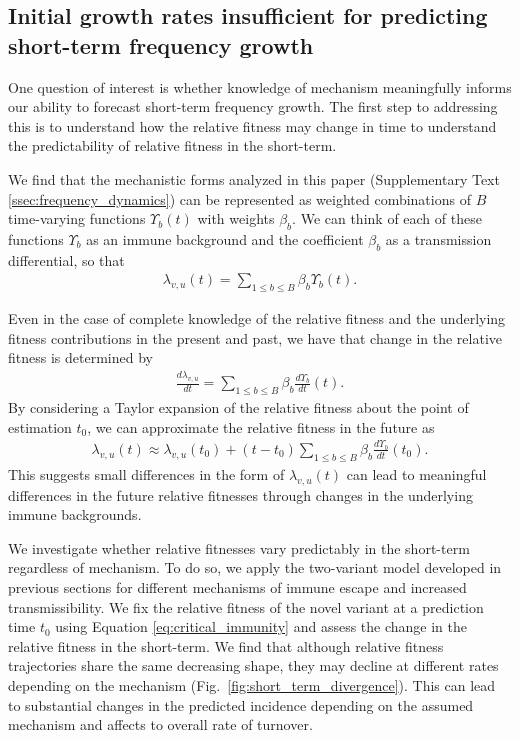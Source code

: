 \documentclass[11pt,oneside,letterpaper]{article}
\begin{document}
\subsection*{Initial growth rates insufficient for predicting short-term frequency growth}

One question of interest is whether knowledge of mechanism meaningfully informs our ability to forecast short-term frequency growth.
The first step to addressing this is to understand how the relative fitness may change in time to understand the predictability of relative fitness in the short-term.

We find that the mechanistic forms analyzed in this paper (Supplementary Text \ref{ssec:frequency_dynamics}) can be represented as weighted combinations of $B$ time-varying functions $\Upsilon_{b}(t)$ with weights $\beta_{b}$.
We can think of each of these functions $\Upsilon_b$ as an immune background and the coefficient $\beta_{b}$ as a transmission differential, so that
\begin{align}
\lambda_{v,u}(t) = \sum_{1 \leq b \leq B} \beta_{b} \Upsilon_{b}(t).
\end{align}

Even in the case of complete knowledge of the relative fitness and the underlying fitness contributions in the present and past, we have that change in the relative fitness is determined by
\begin{align}
    \frac{d\lambda_{v,u}}{dt} = \sum_{1 \leq b \leq B} \beta_{b} \frac{d\Upsilon_{b}}{dt}(t).
\end{align}
By considering a Taylor expansion of the relative fitness about the point of estimation $t_{0}$, we can approximate the relative fitness in the future as
\begin{align}
    \lambda_{v,u}(t) \approx \lambda_{v,u}(t_{0}) + (t - t_0)\sum_{1\leq b \leq B} \beta_b \frac{d\Upsilon_b}{dt}(t_0).
\end{align}
This suggests small differences in the form of $\lambda_{v,u}(t)$ can lead to meaningful differences in the future relative fitnesses through changes in the underlying immune backgrounds.

We investigate whether relative fitnesses vary predictably in the short-term regardless of mechanism.
To do so, we apply the two-variant model developed in previous sections for different mechanisms of immune escape and increased transmissibility.
We fix the relative fitness of the novel variant at a prediction time $t_{0}$ using Equation \ref{eq:critical_immunity} and assess the change in the relative fitness in the short-term.
We find that although relative fitness trajectories share the same decreasing shape, they may decline at different rates depending on the mechanism (Fig.~\ref{fig:short_term_divergence}).
This can lead to substantial changes in the predicted incidence depending on the assumed mechanism and affects to overall rate of turnover.
\end{document}
